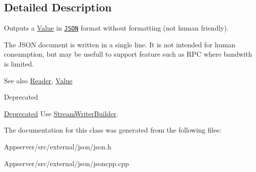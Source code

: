 \subsection{Detailed Description}
Outputs a \hyperlink{classJson_1_1Value}{Value} in \href{http://www.json.org}{\tt J\+S\+ON} format without formatting (not human friendly). 

The J\+S\+ON document is written in a single line. It is not intended for \textquotesingle{}human\textquotesingle{} consumption, but may be usefull to support feature such as R\+PC where bandwith is limited. \begin{DoxySeeAlso}{See also}
\hyperlink{classJson_1_1Reader}{Reader}, \hyperlink{classJson_1_1Value}{Value} 
\end{DoxySeeAlso}
\begin{DoxyRefDesc}{Deprecated}
\item[\hyperlink{deprecated__deprecated000008}{Deprecated}]Use \hyperlink{classJson_1_1StreamWriterBuilder}{Stream\+Writer\+Builder}. \end{DoxyRefDesc}


The documentation for this class was generated from the following files\+:\begin{DoxyCompactItemize}
\item 
Appserver/src/external/json/json.\+h\item 
Appserver/src/external/json/jsoncpp.\+cpp\end{DoxyCompactItemize}
